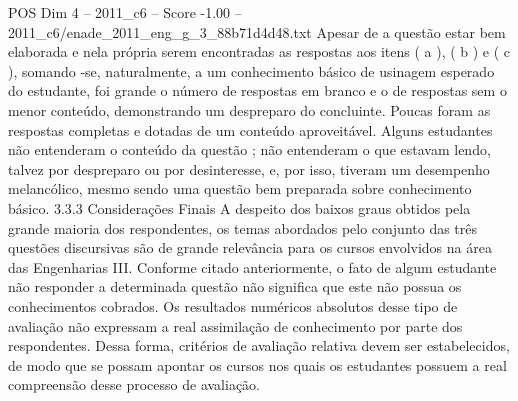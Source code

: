 \begin{textsample}{POS Dim 4 – 2011\_c6 – Score -1.00 – 2011\_c6/enade\_2011\_eng\_g\_3\_88b71d4d48.txt}
Apesar de a questão estar bem elaborada e nela própria serem encontradas as respostas aos itens ( a ), ( b ) e ( c ), somando -se, naturalmente, a um conhecimento básico de usinagem esperado do estudante, foi grande o número de respostas em branco e o de respostas sem o menor conteúdo, demonstrando um despreparo do concluinte.
Poucas foram as respostas completas e dotadas de um conteúdo aproveitável.
Alguns estudantes não entenderam o conteúdo da questão ; não entenderam o que estavam lendo, talvez por despreparo ou por desinteresse, e, por isso, tiveram um desempenho melancólico, mesmo sendo uma questão bem preparada sobre conhecimento básico. 3.3.3 Considerações Finais A despeito dos baixos graus obtidos pela grande maioria dos respondentes, os temas abordados pelo conjunto das três questões discursivas são de grande relevância para os cursos envolvidos na área das Engenharias III.
Conforme citado anteriormente, o fato de algum estudante não responder a determinada questão não significa que este não possua os conhecimentos cobrados.
Os resultados numéricos absolutos desse tipo de avaliação não expressam a real assimilação de conhecimento por parte dos respondentes.
Dessa forma, critérios de avaliação relativa devem ser estabelecidos, de modo que se possam apontar os cursos nos quais os estudantes possuem a real compreensão desse processo de avaliação.

\end{textsample}
